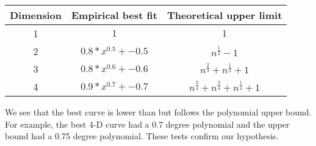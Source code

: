 \begin{tabular}{|c|c|c|}
\hline
Dimension&Empirical best fit&Theoretical upper limit\\
\hline
1&$1$&$1$\\
2&$0.8*x^{0.5} + -0.5$&$n^{\frac{1}{2}}-1$\\
3&$0.8*x^{0.6} + -0.6$&$n^{\frac{2}{3}} + n^{\frac{1}{3}} + 1$\\
4&$0.9*x^{0.7} + -0.7$&$n^{\frac{3}{4}} + n^{\frac{2}{4}} + n^{\frac{1}{4}} + 1$\\
\hline
\end{tabular}

We see that the best curve is lower than but follows the polynomial upper
bound. For example, the best 4-D curve had a 0.7 degree polynomial and the
upper bound had a 0.75 degree polynomial. These tests confirm our
hypothesis.

